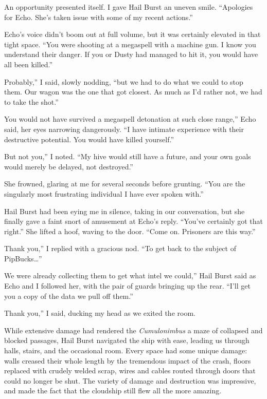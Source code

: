 An opportunity presented itself. I gave Hail Burst an uneven smile. “Apologies for Echo. She’s taken issue with some of my recent actions.”

Echo’s voice didn’t boom out at full volume, but it was certainly elevated in that tight space. “You were shooting at a megaspell with a machine gun. I know you understand their danger. If you or Dusty had managed to hit it, you would have all been killed.”

\leavevmode{}Probably,” I said, slowly nodding, “but we had to do what we could to stop them. Our wagon was the one that got closest. As much as I’d rather not, we had to take the shot.”

\leavevmode{}You would not have survived a megaspell detonation at such close range,” Echo said, her eyes narrowing dangerously. “I have intimate experience with their destructive potential. You would have killed yourself.”

\leavevmode{}But not you,” I noted. “My hive would still have a future, and your own goals would merely be delayed, not destroyed.”

She frowned, glaring at me for several seconds before grunting. “You are the singularly most frustrating individual I have ever spoken with.”

Hail Burst had been eying me in silence, taking in our conversation, but she finally gave a faint snort of amusement at Echo’s reply. “You’ve certainly got that right.” She lifted a hoof, waving to the door. “Come on. Prisoners are this way.”

\leavevmode{}Thank you,” I replied with a gracious nod. “To get back to the subject of PipBucks…”

\leavevmode{}We were already collecting them to get what intel we could,” Hail Burst said as Echo and I followed her, with the pair of guards bringing up the rear. “I’ll get you a copy of the data we pull off them.”

\leavevmode{}Thank you,” I said, ducking my head as we exited the room.

While extensive damage had rendered the \textit{Cumulonimbus} a maze of collapsed and blocked passages, Hail Burst navigated the ship with ease, leading us through halls, stairs, and the occasional room. Every space had some unique damage: walls creased their whole length by the tremendous impact of the crash, floors replaced with crudely welded scrap, wires and cables routed through doors that could no longer be shut. The variety of damage and destruction was impressive, and made the fact that the cloudship still flew all the more amazing.

